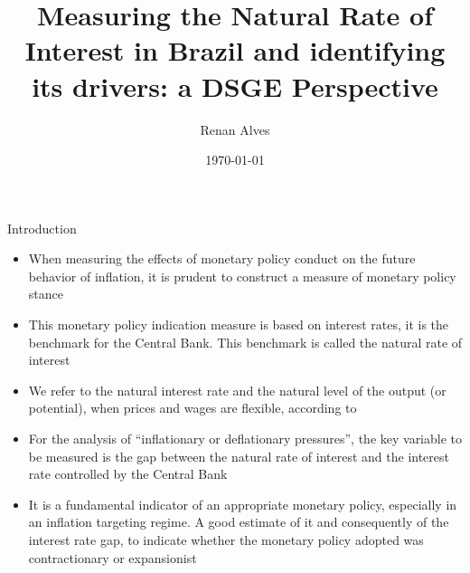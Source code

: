 \documentclass[9pt]{beamer}
\title{Measuring the Natural Rate of Interest  in Brazil and identifying its drivers: a DSGE Perspective}
\subtitle{}
\author[Alves, R. (EESP-FGV)]{Renan Alves}
{Orientador: Dr. Marcel Bertini Ribeiro \\
Coorientador: Dr. Marcelo Kfoury 
}
\date{\today}
\let\olditem\item
\renewcommand{\item}{%
\olditem\vspace{\fill}}
\begin{document}
\maketitle


\begin{frame}{Introduction}
\begin{itemize}

\item When measuring the effects of monetary policy conduct on the future behavior of inflation, it is prudent to construct a measure of monetary policy stance

\item This monetary policy indication measure is based on interest rates, it is the benchmark for the Central Bank. This benchmark is called the natural rate of interest

\item We refer to the natural interest rate and the natural level of the output (or potential), when prices and wages are flexible, according to \textcolor{red}{\citet{Woodford:2003}}

\item For the analysis of “inflationary or deflationary pressures”, the key variable to be measured is the gap between the natural rate of interest and the interest rate controlled by the Central Bank

\item It is a fundamental indicator of an appropriate monetary policy, especially in an inflation targeting regime. A good estimate of it and consequently of the interest rate gap, to indicate whether the monetary policy adopted was contractionary or expansionist


\end{itemize}
\end{frame}
\end{document}
